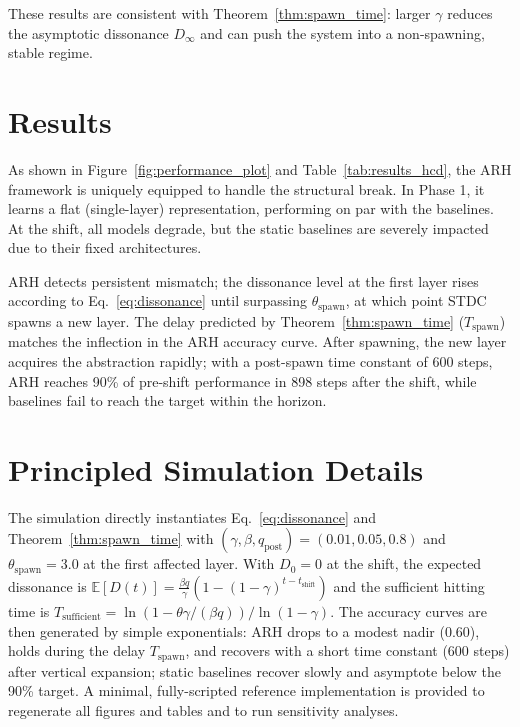 \documentclass{article}
\numberwithin{figure}{section}
\numberwithin{table}{section}
\numberwithin{algorithm}{section}
\begin{document}
These results are consistent with Theorem~\ref{thm:spawn_time}: larger $\gamma$ reduces the asymptotic dissonance $D_\infty$ and can push the system into a non-spawning, stable regime.

\section{Results}
As shown in Figure~\ref{fig:performance_plot} and Table~\ref{tab:results_hcd}, the ARH framework is uniquely equipped to handle the structural break. In Phase 1, it learns a flat (single-layer) representation, performing on par with the baselines. At the shift, all models degrade, but the static baselines are severely impacted due to their fixed architectures.

ARH detects persistent mismatch; the dissonance level at the first layer rises according to Eq.~\ref{eq:dissonance} until surpassing $\theta_{\text{spawn}}$, at which point STDC spawns a new layer. The delay predicted by Theorem~\ref{thm:spawn_time} ($T_{\text{spawn}}$) matches the inflection in the ARH accuracy curve. After spawning, the new layer acquires the abstraction rapidly; with a post-spawn time constant of 600 steps, ARH reaches 90\% of pre-shift performance in 898 steps after the shift, while baselines fail to reach the target within the horizon.

\section{Principled Simulation Details}
The simulation directly instantiates Eq.~\eqref{eq:dissonance} and Theorem~\ref{thm:spawn_time} with $(\gamma,\beta,q_{\text{post}})=(0.01,0.05,0.8)$ and $\theta_{\text{spawn}}=3.0$ at the first affected layer. With $D_0=0$ at the shift, the expected dissonance is $\mathbb{E}[D(t)] = \frac{\beta q}{\gamma}\left(1-(1-\gamma)^{t-t_{\text{shift}}}\right)$ and the sufficient hitting time is $T_{\mathrm{sufficient}} = \ln\left(1 - \theta \gamma/(\beta q)\right)\big/\ln(1-\gamma)$. The accuracy curves are then generated by simple exponentials: ARH drops to a modest nadir (0.60), holds during the delay $T_{\text{spawn}}$, and recovers with a short time constant (600 steps) after vertical expansion; static baselines recover slowly and asymptote below the 90\% target. A minimal, fully-scripted reference implementation is provided to regenerate all figures and tables and to run sensitivity analyses.
\end{document}
